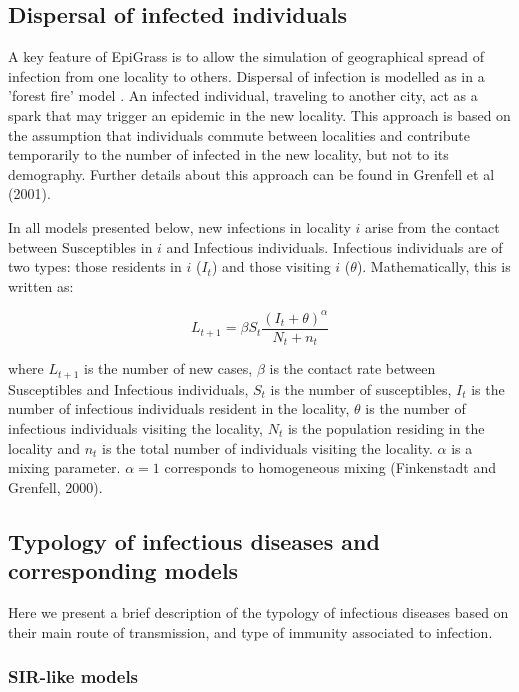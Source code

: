 \subsection{Dispersal of infected individuals}

A key feature of EpiGrass is to allow the simulation of geographical spread of infection from one locality to others. Dispersal of infection is modelled as in a 'forest fire' model \cite{BTGrenfellandONBjoernstadandJKappey2001}. An infected individual, traveling to another city, act as a spark that may trigger an epidemic in the new locality. This approach is based on the assumption that individuals commute between localities and contribute temporarily to the number of infected in the new locality, but not to its demography. Further details about this approach can be found in Grenfell et al (2001).

In all models presented below, new infections in locality $i$ arise from the contact between Susceptibles in $i$ and Infectious individuals. Infectious individuals are of two types: those residents in $i$ ($I_t$) and those visiting $i$ ($\theta$). Mathematically, this is written as:

$$ L_{t+1} = \beta S_t \frac{(I_t+\theta)^\alpha} {N_t+n_t} $$

where $L_{t+1}$ is the number of new cases, $\beta$ is the contact rate between Susceptibles and Infectious individuals, $S_t$ is the number of susceptibles, $I_t$ is the number of infectious individuals resident in the locality, $\theta$ is the number of infectious individuals visiting the locality, $N_t$ is the population residing in the locality and $n_t$ is the total number of individuals visiting the locality. $\alpha$ is a mixing parameter. $\alpha=1$ corresponds to homogeneous mixing (Finkenstadt and Grenfell, 2000).

   
\subsection{Typology of infectious diseases and corresponding models}

Here we present a brief description of the typology of infectious diseases based on their main route of transmission, and type of immunity associated to infection.
 
\subsubsection{SIR-like models}

